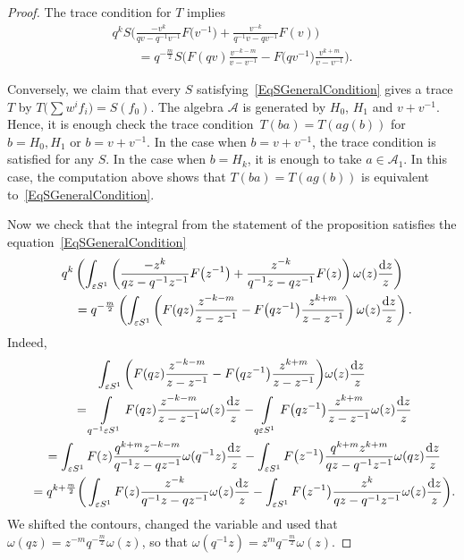 \documentclass[pdftex]{sigma}
\newcommand\eps{\varepsilon}
\newcommand{\mc}{\mathcal}
\numberwithin{equation}{section}
\theoremstyle{definition}
\begin{document}
\begin{proof}
 The trace condition for $T$ implies
 \begin{gather}
 q^kS\bigg(\frac{-v^k}{qv-q^{-1}v^{-1}}F\bigl(v^{-1}\bigr)+\frac{v^{-k}}{q^{-1}v-qv^{-1}}F(v)\bigg)\nonumber\\
 \qquad=q^{-\frac{m}2}S\bigg(F(qv)\frac{v^{-k-m}}{v-v^{-1}}-F\bigl(qv^{-1}\bigr)\frac{v^{k+m}}{v-v^{-1}}\bigg).\label{EqSGeneralCondition}
 \end{gather}

 Conversely, we claim that every $S$ satisfying~\eqref{EqSGeneralCondition} gives a trace $T$ by $T\bigl(\sum w^i f_i\bigr)=S(f_0)$. The algebra $\mc{A}$ is generated by $H_0$, $H_1$ and $v+v^{-1}$. Hence, it is enough check the trace condition~${T(ba)=T(ag(b))}$ for $b=H_0,H_1$ or $b=v+v^{-1}$. In the case when $b=v+v^{-1}$, the trace condition is satisfied for any $S$. In the case when $b=H_k$, it is enough to take $a\in \mc{A}_1$. In this case, the computation above shows that $T(ba)=T(ag(b))$ is equivalent to~\eqref{EqSGeneralCondition}.

 Now we check that the integral from the statement of the proposition satisfies the equation~\eqref{EqSGeneralCondition}
 \begin{gather*}
 q^k \left(\int_{\eps S^1} \left(\frac{-z^k}{qz-q^{-1}z^{-1}}F\bigl(z^{-1}\bigr)+\frac{z^{-k}}{q^{-1}z-qz^{-1}}F(z)\right)\omega(z)\frac{{\rm d}z}{z}\right)\\
\qquad =q^{-\frac{m}2}\left(\int_{\eps S^1}\left(F(qz)\frac{z^{-k-m}}{z-z^{-1}}-F\bigl(qz^{-1}\bigr)\frac{z^{k+m}}{z-z^{-1}}\right)\omega(z)\frac{{\rm d}z}{z}\right)
 .
 \end{gather*}
 Indeed,
 \begin{gather*}
 \int_{\eps S^1}\bigg(F(qz)\frac{z^{-k-m}}{z-z^{-1}}-F\bigl(qz^{-1}\bigr)\frac{z^{k+m}}{z-z^{-1}}\bigg)\omega(z)\frac{{\rm d}z}{z}\\
\qquad= \int\limits_{q^{-1}\eps S^1}F(qz)\frac{z^{-k-m}}{z-z^{-1}}\omega(z)\frac{{\rm d}z}{z}-\int\limits_{q\eps S^1}F\bigl(qz^{-1}\bigr)\frac{z^{k+m}}{z-z^{-1}}\omega(z)\frac{{\rm d}z}{z}\\
 \qquad= \int_{\eps S^1}F(z)\frac{q^{k+m}z^{-k-m}}{q^{-1}z-qz^{-1}}\omega(q^{-1}z)\frac{{\rm d}z}{z}-\int_{\eps S^1}F\bigl(z^{-1}\bigr)\frac{q^{k+m}z^{k+m}}{qz-q^{-1}z^{-1}}\omega(qz)\frac{{\rm d}z}{z}\\
 \qquad= q^{k+\frac{m}{2}}\bigg(\int_{\eps S^1}F(z)\frac{z^{-k}}{q^{-1}z-qz^{-1}}\omega(z)\frac{{\rm d}z}{z}-\int_{\eps S^1}F\bigl(z^{-1}\bigr)\frac{z^k}{qz-q^{-1}z^{-1}}\omega(z)\frac{{\rm d}z}{z}\bigg).
 \end{gather*}
 We shifted the contours, changed the variable and used that $\omega(qz)=z^{-m}q^{-\frac{m}{2}}\omega(z)$, so that $\omega(q^{-1}z)=z^m q^{-\frac{m}{2}}\omega(z)$.


\end{proof}
\end{document}
